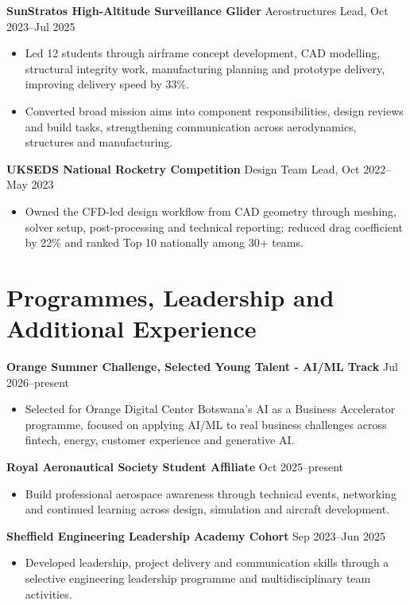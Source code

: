 \documentclass[10pt,a4paper]{article}
\begin{document}
\textbf{SunStratos High-Altitude Surveillance Glider} \hfill Aerostructures Lead, Oct 2023--Jul 2025
\begin{itemize}
  \item Led 12 students through airframe concept development, CAD modelling, structural integrity work, manufacturing planning and prototype delivery, improving delivery speed by 33\%.
  \item Converted broad mission aims into component responsibilities, design reviews and build tasks, strengthening communication across aerodynamics, structures and manufacturing.
\end{itemize}

\textbf{UKSEDS National Rocketry Competition} \hfill Design Team Lead, Oct 2022--May 2023
\begin{itemize}
  \item Owned the CFD-led design workflow from CAD geometry through meshing, solver setup, post-processing and technical reporting; reduced drag coefficient by 22\% and ranked Top 10 nationally among 30+ teams.
\end{itemize}

\section{Programmes, Leadership and Additional Experience}
\textbf{Orange Summer Challenge, Selected Young Talent - AI/ML Track} \hfill Jul 2026--present
\begin{itemize}
  \item Selected for Orange Digital Center Botswana's AI as a Business Accelerator programme, focused on applying AI/ML to real business challenges across fintech, energy, customer experience and generative AI.
\end{itemize}

\textbf{Royal Aeronautical Society Student Affiliate} \hfill Oct 2025--present
\begin{itemize}
  \item Build professional aerospace awareness through technical events, networking and continued learning across design, simulation and aircraft development.
\end{itemize}

\textbf{Sheffield Engineering Leadership Academy Cohort} \hfill Sep 2023--Jun 2025
\begin{itemize}
  \item Developed leadership, project delivery and communication skills through a selective engineering leadership programme and multidisciplinary team activities.
\end{itemize}
\end{document}
